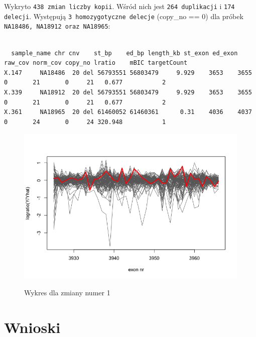 \documentclass[a4paper]{article}
\begin{document}
Wykryto \texttt{438 zmian liczby kopii}. Wśród nich jest \texttt{264 duplikacji} i \texttt{174 delecji}.
Występują \texttt{3 homozygotyczne delecje} (copy\_no == 0) dla próbek \texttt{NA18486, NA18912 oraz NA18965}:
\begin{verbatim}

  sample_name chr cnv    st_bp    ed_bp length_kb st_exon ed_exon raw_cov norm_cov copy_no lratio    mBIC targetCount
X.147     NA18486  20 del 56793551 56803479     9.929    3653    3655       0       21       0     21   0.677           2
X.339     NA18912  20 del 56793551 56803479     9.929    3653    3655       0       21       0     21   0.677           2
X.361     NA18965  20 del 61460052 61460361      0.31    4036    4037       0       24       0     24 320.948           1
\end{verbatim}

\begin{figure}[h]
    \centering
    \includegraphics[width=1.0\textwidth]{plot_change_no_1.png}
    \label{fig:igv}
    \caption[]{Wykres dla zmiany numer 1}
\end{figure}

\section{Wnioski}
\end{document}
